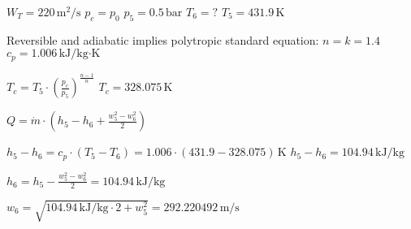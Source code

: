 \( W_T = 220 \, \text{m}^2/\text{s} \)  
\( p_c = p_0 \)  
\( p_5 = 0.5 \, \text{bar} \)  
\( T_6 = ? \)  
\( T_5 = 431.9 \, \text{K} \)  

Reversible and adiabatic implies polytropic standard equation:  
\( n = k = 1.4 \)  
\( c_p = 1.006 \, \text{kJ/kg·K} \)  

\( T_c = T_5 \cdot \left( \frac{p_c}{p_5} \right)^{\frac{n-1}{n}} \)  
\( T_c = 328.075 \, \text{K} \)  

\( Q = \dot{m} \cdot \left( h_5 - h_6 + \frac{w_5^2 - w_6^2}{2} \right) \)  

\( h_5 - h_6 = c_p \cdot (T_5 - T_6) = 1.006 \cdot (431.9 - 328.075) \, \text{K} \)  
\( h_5 - h_6 = 104.94 \, \text{kJ/kg} \)  

\( h_6 = h_5 - \frac{w_5^2 - w_6^2}{2} = 104.94 \, \text{kJ/kg} \)  

\( w_6 = \sqrt{104.94 \, \text{kJ/kg} \cdot 2 + w_5^2} = 292.220492 \, \text{m/s} \)